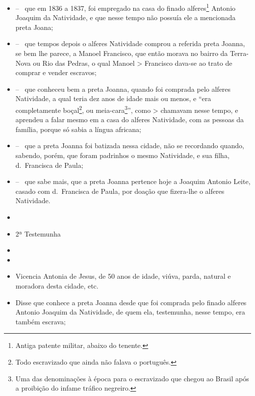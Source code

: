 {\begin{itemize}
\item
  -- ~que em 1836 a 1837, foi empregado na casa do finado
  alferes\footnote{ Antiga patente militar, abaixo do tenente.} Antonio
  Joaquim da Natividade, e que nesse tempo não possuía ele a mencionada
  preta Joana;
\item
  -- ~que tempos depois o alferes Natividade comprou a referida preta
  Joanna, se bem lhe parece, a Manoel Francisco, que então morava no
  bairro da Terra-Nova ou Rio das Pedras, o qual Manoel \textgreater{}
  Francisco dava-se ao trato de comprar e vender escravos;
\item
  -- ~que conheceu bem a preta Joanna, quando foi comprada pelo alferes
  Natividade, a qual teria dez anos de idade mais ou menos, e ``era
  completamente boçal\footnote{ Todo escravizado que ainda não falava o
    português.}, ou meia-cara\footnote{ Uma das denominações à época
    para o escravizado que chegou ao Brasil após a proibição do infame
    tráfico negreiro.}'', como \textgreater{} chamavam nesse tempo, e
  aprendeu a falar mesmo em a casa do alferes Natividade, com as pessoas
  da família, porque só sabia a língua africana;
\item
  -- ~que a preta Joanna foi batizada nessa cidade, não se recordando
  quando, sabendo, porém, que foram padrinhos o mesmo Natividade, e sua
  filha, d.~Francisca de Paula;
\item
  -- ~que sabe mais, que a preta Joanna pertence hoje a Joaquim Antonio
  Leite, casado com d.~Francisca de Paula, por doação que fizera-lhe o
  alferes Natividade.
\item
\item
  2ª Testemunha
\item
\item
\item
  Vicencia Antonia de Jesus, de 50 anos de idade, viúva, parda, natural
  e moradora desta cidade, etc.
\item
  Disse que conhece a preta Joanna desde que foi comprada pelo finado
  alferes Antonio Joaquim da Natividade, de quem ela, testemunha, nesse
  tempo, era também escrava;
\end{itemize}

}
